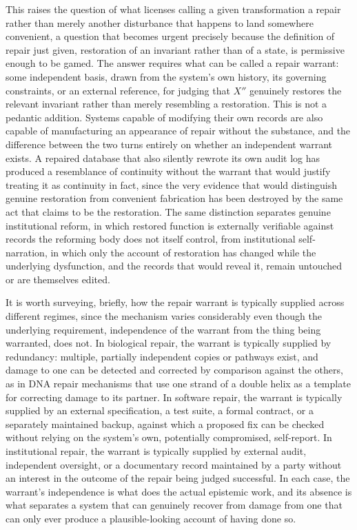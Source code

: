 \documentclass[11pt]{article}
\begin{document}
This raises the question of what licenses calling a given transformation a repair rather than merely another disturbance that happens to land somewhere convenient, a question that becomes urgent precisely because the definition of repair just given, restoration of an invariant rather than of a state, is permissive enough to be gamed. The answer requires what can be called a repair warrant: some independent basis, drawn from the system's own history, its governing constraints, or an external reference, for judging that $X''$ genuinely restores the relevant invariant rather than merely resembling a restoration. This is not a pedantic addition. Systems capable of modifying their own records are also capable of manufacturing an appearance of repair without the substance, and the difference between the two turns entirely on whether an independent warrant exists. A repaired database that also silently rewrote its own audit log has produced a resemblance of continuity without the warrant that would justify treating it as continuity in fact, since the very evidence that would distinguish genuine restoration from convenient fabrication has been destroyed by the same act that claims to be the restoration. The same distinction separates genuine institutional reform, in which restored function is externally verifiable against records the reforming body does not itself control, from institutional self-narration, in which only the account of restoration has changed while the underlying dysfunction, and the records that would reveal it, remain untouched or are themselves edited.

It is worth surveying, briefly, how the repair warrant is typically supplied across different regimes, since the mechanism varies considerably even though the underlying requirement, independence of the warrant from the thing being warranted, does not. In biological repair, the warrant is typically supplied by redundancy: multiple, partially independent copies or pathways exist, and damage to one can be detected and corrected by comparison against the others, as in DNA repair mechanisms that use one strand of a double helix as a template for correcting damage to its partner. In software repair, the warrant is typically supplied by an external specification, a test suite, a formal contract, or a separately maintained backup, against which a proposed fix can be checked without relying on the system's own, potentially compromised, self-report. In institutional repair, the warrant is typically supplied by external audit, independent oversight, or a documentary record maintained by a party without an interest in the outcome of the repair being judged successful. In each case, the warrant's independence is what does the actual epistemic work, and its absence is what separates a system that can genuinely recover from damage from one that can only ever produce a plausible-looking account of having done so.
\end{document}
